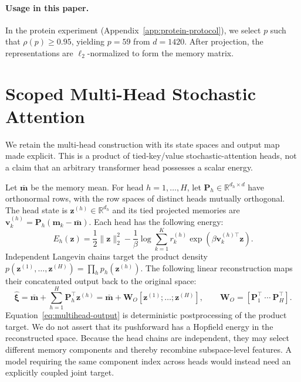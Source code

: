 \paragraph{Usage in this paper.}
In the protein experiment (Appendix~\ref{app:protein-protocol}), we select $p$
such that $\rho(p)\geq0.95$, yielding $p=59$ from $d=1420$. After projection,
the representations are $\ell_2$-normalized to form the memory matrix.


\section{Scoped Multi-Head Stochastic Attention}
\label{app:multihead}

We retain the multi-head construction with its state spaces and output map made
explicit. This is a product of tied-key/value stochastic-attention heads, not a
claim that an arbitrary transformer head possesses a scalar energy.

Let $\bar{\mathbf m}$ be the memory mean. For head $h=1,\ldots,H$, let
$\mathbf P_h\in\mathbb R^{d_h\times d}$ have orthonormal rows, with the row
spaces of distinct heads mutually orthogonal. The head state is
$\mathbf z^{(h)}\in\mathbb R^{d_h}$ and its tied projected memories are
$\mathbf v_k^{(h)}=\mathbf P_h(\mathbf m_k-\bar{\mathbf m})$. Each head has
the following energy:
\begin{equation}
E_h(\mathbf z)=\frac12\lVert\mathbf z\rVert_2^2
-\frac1\beta\log\sum_{k=1}^K r_k^{(h)}
\exp\!\left(\beta\mathbf v_k^{(h)\top}\mathbf z\right).
\label{eq:multihead-energy}
\end{equation}
Independent Langevin chains target the product density
$p(\mathbf z^{(1)},\ldots,\mathbf z^{(H)})=\prod_h p_h(\mathbf z^{(h)})$.
The following linear reconstruction maps their concatenated output back to the
original space:
\begin{equation}
\widehat{\boldsymbol\xi}
=\bar{\mathbf m}+\sum_{h=1}^H\mathbf P_h^\top\mathbf z^{(h)}
=\bar{\mathbf m}+\mathbf W_O
[\mathbf z^{(1)};\ldots;\mathbf z^{(H)}],
\qquad
\mathbf W_O=[\mathbf P_1^\top\ \cdots\ \mathbf P_H^\top].
\label{eq:multihead-output}
\end{equation}
Equation~\eqref{eq:multihead-output} is deterministic postprocessing of the
product target. We do not assert that its pushforward has a Hopfield energy in
the reconstructed space. Because the head chains are independent, they may
select different memory components and thereby recombine subspace-level
features. A model requiring the same component index across heads would instead
need an explicitly coupled joint target.

